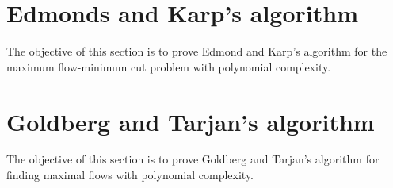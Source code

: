
\section{Edmonds and Karp's algorithm}

The objective of this section is to prove Edmond and Karp's algorithm
for the maximum flow-minimum cut problem with polynomial
complexity.



\section{Goldberg and Tarjan's algorithm}

The objective of this section is to prove Goldberg and Tarjan's
algorithm for finding maximal flows with polynomial complexity.
